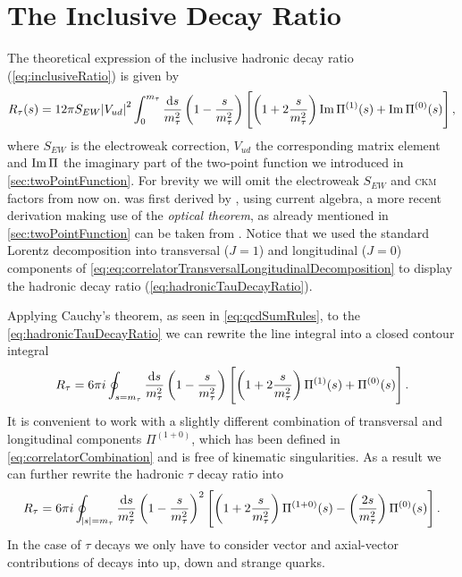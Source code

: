 \documentclass[../../index.tex]{subfiles}
\begin{document}
\section{The Inclusive Decay Ratio}
The theoretical expression of the inclusive hadronic decay ratio
(\cref{eq:inclusiveRatio}) is given by
\begin{equation}
  \label{eq:hadronicTauDecayRatio}
  R_\tau(s) = 12 \pi S_{EW} \abs{V_{ud}}^2 \int_0^{m_\tau} \frac{\dif s}{m_\tau^2}
  \left( 1 - \frac{s}{m_\tau^2} \right)
  \left[ \left( 1 + 2 \frac{s}{m_\tau^2} \right) \Ima \Pi^{(1)}(s) + \Ima \Pi^{(0)}(s) \right],
\end{equation}
where \(S_{EW}\) is the electroweak correction, \(V_{ud}\) the corresponding
 matrix element and $\operatorname{Im} \Pi$ the
imaginary part of the two-point function we introduced in
\cref{sec:twoPointFunction}. For brevity we will omit the electroweak
\(S_{EW}\) and \textsc{ckm} factors from now on. 
was first derived by \cite{Tsai1971}, using current algebra, a more recent
derivation making use of the \textit{optical theorem}, as already mentioned in
\cref{sec:twoPointFunction} can be taken from \cite{Schwab2002}. Notice that we
used the standard Lorentz decomposition into transversal (\(J=1\)) and
longitudinal (\(J=0\)) components of
\cref{eq:eq:correlatorTransversalLongitudinalDecomposition} to display the
hadronic decay ratio (\cref{eq:hadronicTauDecayRatio}).

Applying Cauchy's theorem, as seen in \cref{eq:qcdSumRules}, to the
\cref{eq:hadronicTauDecayRatio} we can rewrite the line integral into a closed
contour integral
\begin{equation}
  \label{eq:rTauT+L}
  R_\tau = 6 \pi i \oint_{s=m_\tau} \frac{\dif s}{m_\tau^2}
  \left( 1 - \frac{s}{m_\tau^2} \right)
  \left[ \left( 1 + 2 \frac{s}{m_\tau^2} \right) \Pi^{(1)}(s) + \Pi^{(0)}(s) \right].
\end{equation}
It is convenient to work with a slightly different combination of transversal
and longitudinal components \(\Pi^{(1+0)}\), which has been defined in
\cref{eq:correlatorCombination} and is free of kinematic singularities. As a
result we can further rewrite the hadronic \(\tau\) decay ratio into
\begin{equation}
  \label{eq:tauDecayRatioT+L}
  R_\tau = 6 \pi i \oint_{\abs{s}=m_\tau} \frac{\dif s}{m_\tau^2}
  \left( 1 - \frac{s}{m_\tau^2} \right)^2
  \left[ \left( 1 + 2 \frac{s}{m_\tau^2} \right) \Pi^{(1+0)}(s) - \left( \frac{2 s}{m_\tau^2} \right) \Pi^{(0)}(s) \right].
\end{equation}
In the case of \(\tau\) decays we only have to consider vector and axial-vector
contributions of decays into up, down and strange quarks.
\end{document}
